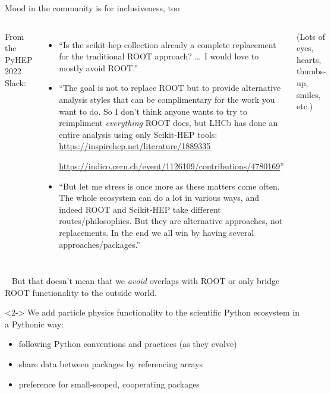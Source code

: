 \documentclass[aspectratio=169]{beamer}
\begin{document}
\begin{frame}{Mood in the community is for inclusiveness, too}
\vspace{0.5 cm}
\begin{columns}
From the PyHEP 2022 Slack:

\vspace{0.15 cm}
\begin{itemize}\setlength{\itemsep}{0.25 cm}
\item ``Is the scikit-hep collection already a complete replacement for the traditional ROOT approach? \ldots\ I would love to mostly avoid ROOT.''

\item ``The goal is not to replace ROOT but to provide alternative analysis styles that can be complimentary for the work you want to do. So I don't think anyone wants to try to reimpliment {\it everything} ROOT does, but LHCb has done an entire analysis using only Scikit-HEP tools: \textcolor{blue}{\url{https://inspirehep.net/literature/1889335}}

\textcolor{blue}{\url{https://indico.cern.ch/event/1126109/contributions/4780169}}''

\item ``But let me stress is once more as these matters come often. The whole ecosystem can do a lot in various ways, and indeed ROOT and Scikit-HEP take different routes/philosophies. But they are alternative approaches, not replacements. In the end we all win by having several approaches/packages.''
\end{itemize}

\vspace{0.25 cm}
(Lots of eyes, hearts, thumbs-up, smiles, etc.)
\end{columns}
\end{frame}

\begin{frame}{\mbox{ }}
\Large
But that doesn't mean that we {\it avoid} overlaps with ROOT or only bridge ROOT functionality to the outside world.

\vspace{1 cm}
\begin{uncoverenv}<2->
We add particle physics functionality to the scientific Python ecosystem in a Pythonic way:

\begin{itemize}
\item<3-> following Python conventions and practices (as they evolve)
\item<4-> share data between packages by referencing arrays
\item<5-> preference for small-scoped, cooperating packages
\end{itemize}
\end{uncoverenv}
\end{frame}
\end{document}
